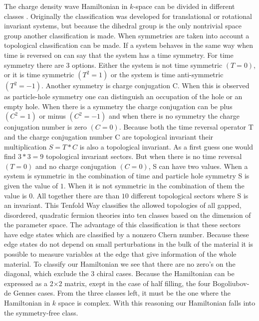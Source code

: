 \documentclass[letterpaper, 10 pt, conference]{ieeeconf}  %
\begin{document}
The charge density wave Hamiltonian in $k$-space can be divided in different
classes \cite{ryu2010}. Originally the classification was developed for translational or
rotational invariant systems, but because the dihedral group is the only
nontrivial space group another classification is made. When symmetries are taken
into account a topological classification can be made. If a system behaves in
the same way when time is reversed on can say that the system has a time
symmetry. For time symmetry there are 3 options. Either the system is not time
symmetric $(T=0)$, or it is time symmetric $(T^2=1)$ or the system is time
anti-symmetric  $(T^2=-1)$.  Another symmetry  is charge conjugation C. When
this is observed as particle-hole symmetry one can distinguish an occupation of
the hole or an empty hole. When there is a symmetry the  charge conjugation can
be plus $(C^2=1)$ or minus $(C^2=-1)$ and when there is no symmetry  the charge
conjugation number  is zero $(C=0)$.  Because both the time reversal operator T
and the charge conjugation number C are topological invariant their
multiplication $S=T * C $ is also a topological invariant. As a first guess one
would find $3 * 3 = 9 $ topological invariant sectors. But when there is no time
reversal $(T=0)$ and no charge conjugation $(C=0)$, S can have two values. When
a system is symmetric in the combination of time and particle hole symmetry S is
given the value of $1$. When it is not symmetric in the combination of them the
value is $0$. All together there are than $10$ different topological sectors
where S is an invariant. This Tenfold Way classifies the allowed topologies of
all gapped, disordered, quadratic fermion theories into ten classes based on the
dimension of the parameter space. The advantage of this classification is that
these sectors have edge states which are classified by a nonzero Chern number.
Because these edge states do not
depend on small perturbations in the bulk of the material it is possible to
measure variables at the edge that give information of the whole material.
To classify our Hamiltonian we see that there are no zero's on the diagonal,
which exclude the 3 chiral cases. Because the Hamiltonian can be expressed as a 2$\times$2
 matrix, exept in the case of half filling, the four Bogoliubov-de Gennes cases. From the three
 classes left, it must be the one where the Hamiltonian in $k$ space is complex.
 With this reasoning our Hamiltonian falls into the symmetry-free class.


%
\end{document}
